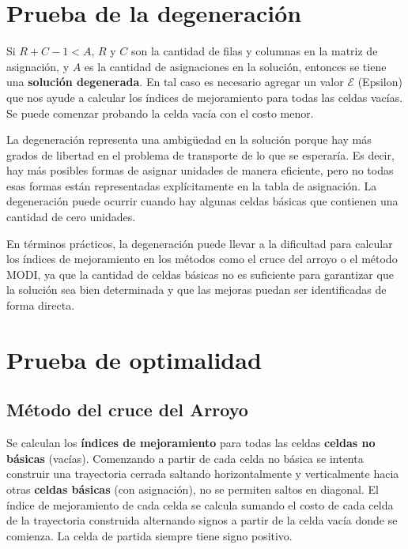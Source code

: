 	\section{Prueba de la degeneración}
	
	Si $R+C-1 < A$, $R$ y $C$ son la cantidad de filas y columnas en la matriz de asignación, y $A$ es la cantidad de asignaciones en la solución, entonces se tiene una \textbf{solución degenerada}. En tal caso es necesario agregar un valor $\mathcal{E}$ (Epsilon) que nos ayude a calcular los índices de mejoramiento para todas las celdas vacías. Se puede comenzar probando la celda vacía con el costo menor.
	
	La degeneración representa una ambigüedad en la solución porque hay más grados de libertad en el problema de transporte de lo que se esperaría. Es decir, hay más posibles formas de asignar unidades de manera eficiente, pero no todas esas formas están representadas explícitamente en la tabla de asignación. La degeneración puede ocurrir cuando hay algunas celdas básicas que contienen una cantidad de cero unidades.
	
	En términos prácticos, la degeneración puede llevar a la dificultad para calcular los índices de mejoramiento en los métodos como el cruce del arroyo o el método MODI, ya que la cantidad de celdas básicas no es suficiente para garantizar que la solución sea bien determinada y que las mejoras puedan ser identificadas de forma directa.

	\section{Prueba de optimalidad}
	
	\subsection{Método del cruce del Arroyo}
	
	Se calculan los \textbf{índices de mejoramiento} para todas las celdas \textbf{celdas no básicas} (vacías). 
	Comenzando a partir de cada celda no básica se intenta construir una trayectoria cerrada saltando horizontalmente y verticalmente hacia otras \textbf{celdas básicas} (con asignación), no se permiten saltos en diagonal. El índice de mejoramiento de cada celda se calcula sumando el costo de cada celda de la trayectoria construida alternando signos a partir de la celda vacía donde se comienza. La celda de partida siempre tiene signo positivo.
	
